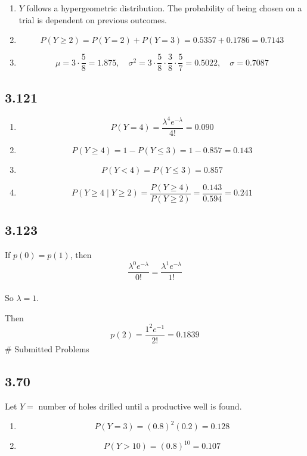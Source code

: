 \documentclass[
  letterpaper,
  DIV=11,
  numbers=noendperiod]{scrartcl}
\begin{document}
\begin{enumerate}
\def\labelenumi{(\alph{enumi})}
\item
  \(Y\) follows a hypergeometric distribution. The probability of being
  chosen on a trial is dependent on previous outcomes.
\item
  \[P(Y \geq 2) = P(Y=2) + P(Y=3) = 0.5357 + 0.1786 = 0.7143\]
\item
  \[\mu = 3 \cdot \frac{5}{8} = 1.875, \quad \sigma^2 = 3 \cdot \frac{5}{8} \cdot \frac{3}{8} \cdot \frac{5}{7} = 0.5022, \quad \sigma = 0.7087\]
\end{enumerate}

\subsection{3.121}\label{section-8}

\begin{enumerate}
\def\labelenumi{(\alph{enumi})}
\item
  \[P(Y=4) = \frac{\lambda^4 e^{-\lambda}}{4!} = 0.090\]
\item
  \[P(Y \geq 4) = 1 - P(Y \leq 3) = 1 - 0.857 = 0.143\]
\item
  \[P(Y < 4) = P(Y \leq 3) = 0.857\]
\item
  \[P(Y \geq 4 \mid Y \geq 2) = \frac{P(Y \geq 4)}{P(Y \geq 2)} = \frac{0.143}{0.594} = 0.241\]
\end{enumerate}

\subsection{3.123}\label{section-9}

If \(p(0) = p(1)\), then\\
\[\frac{\lambda^0 e^{-\lambda}}{0!} = \frac{\lambda^1 e^{-\lambda}}{1!}\]\\
So \(\lambda = 1\).

Then\\
\[p(2) = \frac{1^2 e^{-1}}{2!} = 0.1839\] \# Submitted Problems

\subsection{3.70}\label{section-10}

Let \(Y =\) number of holes drilled until a productive well is found.

\begin{enumerate}
\def\labelenumi{(\alph{enumi})}
\item
  \[P(Y=3) = (0.8)^2 (0.2) = 0.128\]
\item
  \[P(Y > 10) = (0.8)^{10} = 0.107\]
\end{enumerate}
\end{document}
